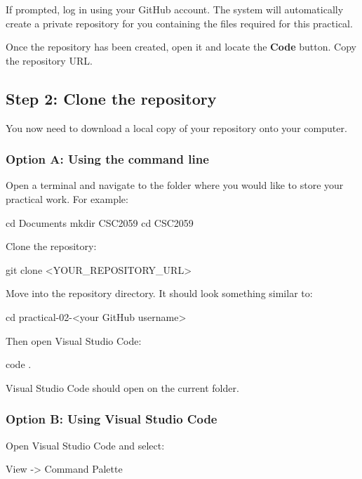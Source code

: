 \documentclass{csc2059practical}
\begin{document}
If prompted, log in using your GitHub account. The system will automatically create a private repository for you containing the files required for this practical.

Once the repository has been created, open it and locate the \textbf{Code} button. Copy the repository URL.

\subsection{Step 2: Clone the repository}

You now need to download a local copy of your repository onto your computer.

\subsubsection{Option A: Using the command line}

Open a terminal and navigate to the folder where you would like to store your practical work. For example:

\begin{bashcode}
cd Documents
mkdir CSC2059
cd CSC2059
\end{bashcode}

Clone the repository:

\begin{bashcode}
git clone <YOUR_REPOSITORY_URL>
\end{bashcode}

Move into the repository directory.  It should look something similar to:

\begin{bashcode}
cd practical-02-<your GitHub username>
\end{bashcode}

Then open Visual Studio Code:

\begin{bashcode}
code .
\end{bashcode}

Visual Studio Code should open on the current folder.

\subsubsection{Option B: Using Visual Studio Code}

Open Visual Studio Code and select:

\begin{terminal}
View -> Command Palette
\end{terminal}
\end{document}
